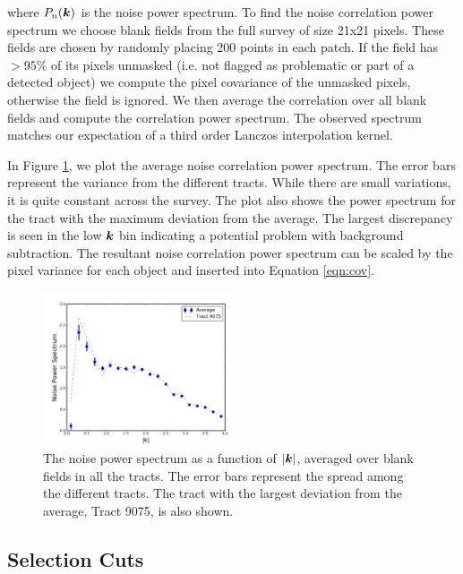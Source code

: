 \documentclass[useAMS,usenatbib]{mnras}
\newcommand{\veck}{\mbox{\boldmath $k$}}
\begin{document}
where $P_n(\veck)$ is the noise power spectrum.  To find the noise correlation power spectrum we choose blank fields from the full survey of size 21x21 pixels.  These fields are chosen by randomly placing 200 points in each patch. If the field has $> 95\%$ of its pixels unmasked (i.e. not flagged as problematic or part of a detected object) we compute the pixel covariance of the unmasked pixels, otherwise the field is ignored.  We then average the correlation over all blank fields and compute the correlation power spectrum.  The observed spectrum matches our expectation of a third order Lanczos interpolation kernel.  

In Figure \ref{fig:noise_ps}, we plot the average noise correlation power spectrum.  The error bars represent the variance from the different tracts.  While there are small variations, it is quite constant across the survey.  The plot also shows the power spectrum for the tract with the maximum deviation from the average.  The largest discrepancy is seen in the low $\veck$ bin indicating a potential problem with background subtraction.  The resultant noise correlation power spectrum can be scaled by the pixel variance for each object and inserted into Equation \ref{eqn:cov}. 


\begin{figure}
    \includegraphics[width=0.5\textwidth]{noise_ps.png}
    \caption{
       The noise power spectrum as a function of $|\veck|$, averaged over blank fields in all the tracts.  The error bars represent the spread among the different tracts.  The tract with the largest deviation from the average, Tract 9075, is also shown.
    }
    \label{fig:noise_ps}
\end{figure}

\subsection{Selection Cuts}
\end{document}
